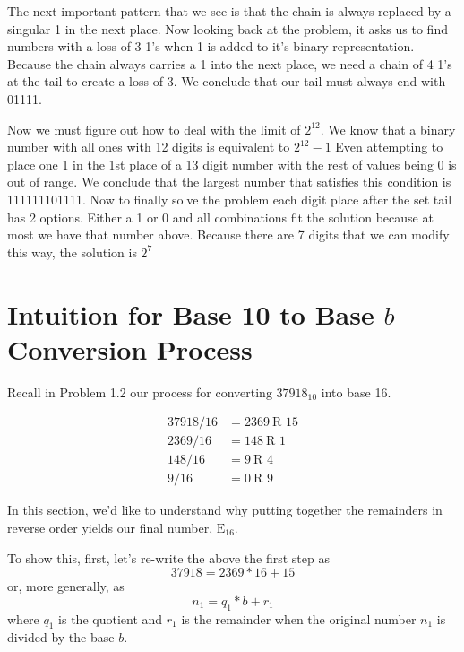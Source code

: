 \documentclass[12pt]{article}
\begin{document}
\begin{enumerate}
The next important pattern that we see is that the chain is always replaced by a singular 1 in the next place. Now looking back at the problem, it asks us to find numbers with a loss of 3 1's when 1 is added to it's binary representation. Because the chain always carries a 1 into the next place, we need a chain of 4 1's at the tail to create a loss of 3. We conclude that our tail must always end with 01111.

Now we must figure out how to deal with the limit of $2^{12}$. We know that a binary number with all ones with 12 digits is equivalent to $2^{12} - 1$ Even attempting to place one 1 in the 1st place of a 13 digit number with the rest of values being 0 is out of range. We conclude that the largest number that satisfies this condition is 111111101111. Now to finally solve the problem each digit place after the set tail has 2 options. Either a 1 or 0 and all combinations fit the solution because at most we have that number above. Because there are 7 digits that we can modify this way, the solution is $2^7$ 

\end{enumerate}

\appendix

\section{Intuition for Base 10 to Base $b$ Conversion Process}
Recall in Problem 1.2 our process for converting $37918_{10}$ into base 16.

\begin{align*}
37918/16 &= 2369~\text{R 15}\\
2369/16 &= 148~\text{R 1}\\
148/16 &= 9~\text{R 4}\\
9/16 &= 0~\text{R 9}
\end{align*}

In this section, we'd like to understand why putting together the remainders in reverse order yields our final number, $\text{E}_{16}$.

To show this, first, let's re-write the above the first step as
\begin{equation*}
37918 = 2369 * 16 + 15
\end{equation*}
or, more generally, as
\begin{equation}
\label{general_divison}
n_1 = q_1 * b + r_1
\end{equation}
where $q_1$ is the quotient and $r_1$ is the remainder when the original number $n_1$ is divided by the base $b$.
\end{document}

